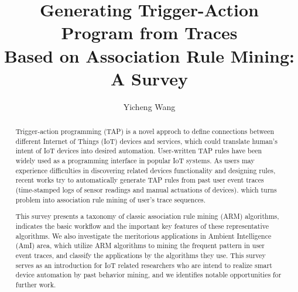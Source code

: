 \documentclass[sigplan, screen]{acmart}
\begin{document}
\title{Generating Trigger-Action Program from Traces\\Based on Association Rule Mining: A Survey}

\author{Yicheng Wang}

\renewcommand{\shortauthors}{Yicheng Wang}

\begin{abstract}
  Trigger-action programming (TAP) is a novel approch to define connections between different Internet of Things (IoT) devices and services,
  which could translate human’s intent of IoT devices into desired automation. User-written TAP rules have been widely used
  as a programming interface in popular IoT systems.
  As users may experience difficulties in discovering related devices functionality and designing rules, recent works try to
  automatically generate TAP rules from past user event traces (time-stamped logs of sensor readings and manual actuations of devices).
  which turns problem into association rule mining of user's trace sequences.

  This survey presents a taxonomy of classic association rule mining (ARM) algorithms, indicates the basic workflow and the important key features of these
  representative algorithms. We also investigate the meritorious applications in Ambient Intelligence (AmI) area, which utilize ARM algorithms to mining the frequent 
  pattern in user event traces, and classify the applications by the algorithms they use. This survey serves as an introduction for IoT related researchers who 
  are intend to realize smart device automation by past behavior mining, and we identifies notable opportunities for further work.


  
\end{abstract}
\end{document}
